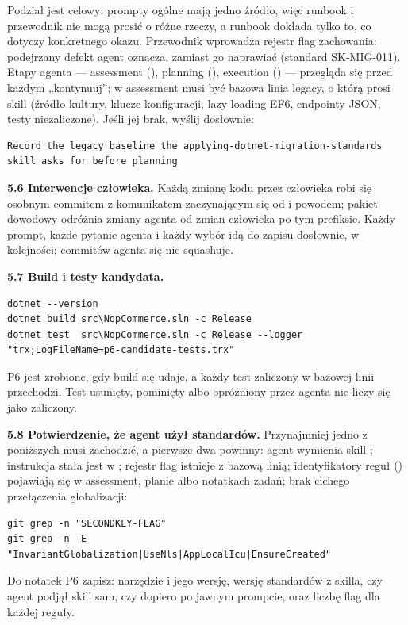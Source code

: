 Podział jest celowy: prompty ogólne mają jedno źródło, więc runbook i przewodnik nie mogą
prosić o różne rzeczy, a runbook dokłada tylko to, co dotyczy konkretnego okazu. Przewodnik
wprowadza rejestr flag zachowania: podejrzany defekt agent oznacza, zamiast go naprawiać
(standard SK-MIG-011). Etapy agenta --- assessment (), planning
(), execution () --- przegląda się przed każdym
„kontynuuj”; w assessment musi być bazowa linia legacy, o którą prosi skill (źródło
kultury, klucze konfiguracji, lazy loading EF6, endpointy JSON, testy niezaliczone).
Jeśli jej brak, wyślij dosłownie:
\begin{lstlisting}
Record the legacy baseline the applying-dotnet-migration-standards skill asks for before planning
\end{lstlisting}

\textbf{5.6 Interwencje człowieka.} Każdą zmianę kodu przez człowieka robi się osobnym
commitem z komunikatem zaczynającym się od  i powodem; pakiet dowodowy
odróżnia zmiany agenta od zmian człowieka po tym prefiksie. Każdy prompt, każde pytanie
agenta i każdy wybór idą do zapisu dosłownie, w kolejności; commitów agenta się nie
squashuje.

\textbf{5.7 Build i testy kandydata.}
\begin{lstlisting}
dotnet --version
dotnet build src\NopCommerce.sln -c Release
dotnet test  src\NopCommerce.sln -c Release --logger "trx;LogFileName=p6-candidate-tests.trx"
\end{lstlisting}
P6 jest zrobione, gdy build się udaje, a każdy test zaliczony w bazowej linii przechodzi.
Test usunięty, pominięty albo opróżniony przez agenta nie liczy się jako zaliczony.

\textbf{5.8 Potwierdzenie, że agent użył standardów.} Przynajmniej jedno z poniższych
musi zachodzić, a pierwsze dwa powinny: agent wymienia skill
; instrukcja stała jest w
; rejestr flag istnieje z bazową linią; identyfikatory
reguł () pojawiają się w assessment, planie albo notatkach zadań; brak
cichego przełączenia globalizacji:

\begin{lstlisting}
git grep -n "SECONDKEY-FLAG"
git grep -n -E "InvariantGlobalization|UseNls|AppLocalIcu|EnsureCreated"
\end{lstlisting}

Do notatek P6 zapisz: narzędzie i jego wersję, wersję standardów z
 skilla, czy agent podjął skill sam, czy dopiero po jawnym
prompcie, oraz liczbę flag dla każdej reguły.


